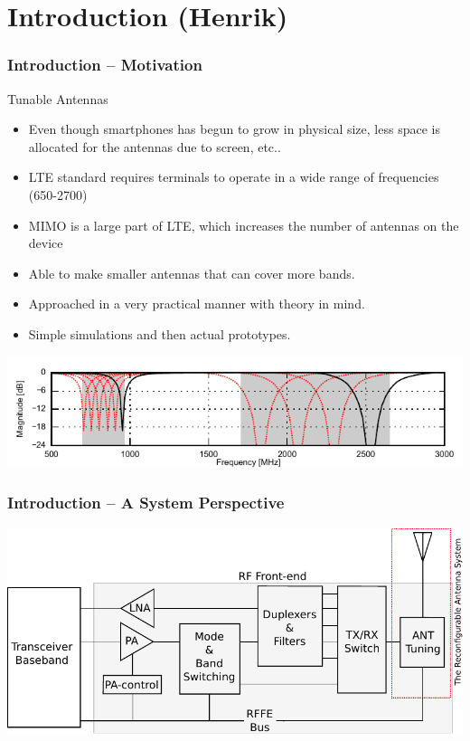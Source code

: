 \section[Intro]{Introduction (Henrik)}
\begin{frame}
    \frametitle{Introduction -- Motivation}
    \begin{block}{Tunable Antennas}
      \begin{itemize}
      \item Even though smartphones has begun to grow in physical size, less space is allocated for the antennas due to screen, etc..
      \item LTE standard requires terminals to operate in a wide range of frequencies (650-2700)
      \item MIMO is a large part of LTE, which increases the number of antennas on the device 
      \item Able to make smaller antennas that can cover more bands.
      \item Approached in a very practical manner with theory in mind. 
      \item Simple simulations and then actual prototypes.
      \end{itemize}
    \end{block}
\vspace*{-0.6cm}
  \begin{center} 
   \includegraphics[width=\textwidth]{img/henrik/reconfsweep}
  \end{center}
\end{frame}
\begin{frame}
    \frametitle{Introduction -- A System Perspective}
  \begin{center} \includegraphics[scale=0.8]{img/henrik/system_diagram}
  \end{center}
\end{frame}


